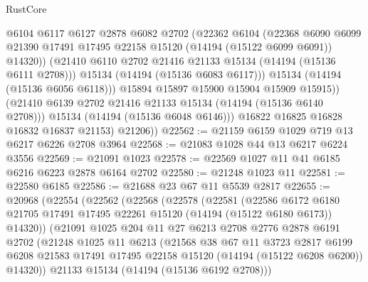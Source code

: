 \begin{lexlean}{RustCore}
\begin{coremodule}
                    @6104
                    @6117
                    @6127
                    @2878
                    @6082
                    @2702
                    (@22362
                      @6104
                      (@22368
                        @6090
                        @6099
                        @21390
                        @17491
                        @17495
                        @22158
                        @15120
                        (@14194 (@15122 @6099 @6091))
                        @14320))
                    (@21410 @6110 @2702 @21416 @21133 @15134 (@14194 (@15136 @6111 @2708)))
                    @15134
                    (@14194 (@15136 @6083 @6117)))
                  @15134
                  (@14194 (@15136 @6056 @6118)))
                @15894
                @15897
                @15900
                @15904
                @15909
                @15915))
            (@21410 @6139 @2702 @21416 @21133 @15134 (@14194 (@15136 @6140 @2708)))
            @15134
            (@14194 (@15136 @6048 @6146)))
          @16822
          @16825
          @16828
          @16832
          @16837
          @21153)
        @21206))
@22562 := @21159 @6159 @1029 @719 @13 @6217 @6226 @2708 @3964
@22568 := @21083 @1028 @44 @13 @6217 @6224 @3556
@22569 := @21091 @1023
@22578 := @22569 @1027 @11 @41 @6185 @6216 @6223 @2878 @6164 @2702
@22580 := @21248 @1023 @11
@22581 := @22580 @6185
@22586 := @21688 @23 @67 @11 @5539 @2817
@22655 := @20968
    (@22554
      (@22562
        (@22568
          (@22578
            (@22581
              (@22586
                @6172
                @6180
                @21705
                @17491
                @17495
                @22261
                @15120
                (@14194 (@15122 @6180 @6173))
                @14320))
            (@21091
              @1025
              @204
              @11
              @27
              @6213
              @2708
              @2776
              @2878
              @6191
              @2702
              (@21248
                @1025
                @11
                @6213
                (@21568
                  @38
                  @67
                  @11
                  @3723
                  @2817
                  @6199
                  @6208
                  @21583
                  @17491
                  @17495
                  @22158
                  @15120
                  (@14194 (@15122 @6208 @6200))
                  @14320))
              @21133
              @15134
              (@14194 (@15136 @6192 @2708)))

\end{coremodule}
\end{lexlean}
